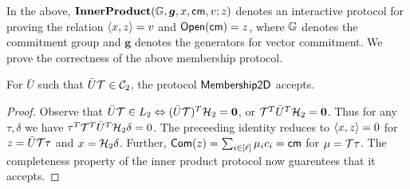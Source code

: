 In the above,
$\mathbf{InnerProduct}(\mathbb{G},\bm{g},x,\mathsf{cm},v;z)$ denotes an interactive
protocol for proving the relation $\langle x,z\rangle=v$ and $\mathsf{Open}(\mathsf{cm})=z$,
where $\mathbb{G}$ denotes the commitment group and $\bm{g}$ denotes the generators for
vector commitment. We prove the correctness of the above membership protocol.

\begin{lemma}[Completeness]\label{lem:proximity2d_complete}
For $\bar{U}$ such that $\bar{U}\mathcal{T}\in \mathcal{C}_2$, the protocol $\mathsf{Membership2D}$ accepts.
\end{lemma}
\begin{proof}
Observe that $\bar{U}\mathcal{T}\in L_2 \Leftrightarrow (\bar{U}\mathcal{T})^T\mathcal{H}_2=\bm{0}$, or
$\mathcal{T}^T\bar{U}^T\mathcal{H}_2=\bm{0}$. Thus for any $\tau,\delta$ we have
$\tau^T\mathcal{T}^T\bar{U}^T\mathcal{H}_2\delta=0$. The preceeding identity reduces to
$\langle x,z\rangle=0$ for  $z=\bar{U}\mathcal{T}\tau$ and
$x=\mathcal{H}_2\delta$. Further,
$\mathsf{Com}(z)=\sum_{i\in [\ell]}\mu_ic_i=\mathsf{cm}$ for $\mu=\mathcal{T}\tau$. The
completeness property of the inner product protocol now guarentees that it
accepts.
\end{proof}
 
